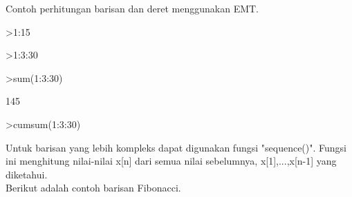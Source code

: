 \documentclass[a4paper,10pt]{article}
\begin{document}
\begin{eulernotebook}
\begin{eulercomment}
\begin{eulercomment}
\begin{eulercomment}
\begin{eulercomment}
\begin{eulercomment}
Contoh perhitungan barisan dan deret menggunakan EMT.

\end{eulercomment}
\begin{eulerprompt}
>1:15
\end{eulerprompt}
\begin{euleroutput}
  [1,  2,  3,  4,  5,  6,  7,  8,  9,  10,  11,  12,  13,  14,  15]
\end{euleroutput}
\begin{eulerprompt}
>1:3:30
\end{eulerprompt}
\begin{euleroutput}
  [1,  4,  7,  10,  13,  16,  19,  22,  25,  28]
\end{euleroutput}
\begin{eulerprompt}
>sum(1:3:30)
\end{eulerprompt}
\begin{euleroutput}
  145
\end{euleroutput}
\begin{eulerprompt}
>cumsum(1:3:30)
\end{eulerprompt}
\begin{euleroutput}
  [1,  5,  12,  22,  35,  51,  70,  92,  117,  145]
\end{euleroutput}
\begin{eulercomment}
Untuk barisan yang lebih kompleks dapat digunakan fungsi "sequence()".
Fungsi ini menghitung nilai-nilai x[n] dari semua nilai sebelumnya,
x[1],...,x[n-1] yang diketahui.\\
Berikut adalah contoh barisan Fibonacci.


\end{eulercomment}
\end{eulercomment}
\end{eulercomment}
\end{eulercomment}
\end{eulercomment}
\end{eulernotebook}
\end{document}
